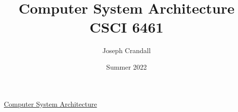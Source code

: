 
\usepackage{algorithm, algpseudocode, color, gensymb, siunitx, soul, subfiles, verbatim}
\usepackage[a4paper, total={7.5in, 10in}]{geometry}

\title{Computer System Architecture\\
\large CSCI 6461}
\author{Joseph Crandall}
\date{Summer 2022}


\maketitle

\href{https://www.mslcourses.com/CSCI6461Section10Summer2022/Schedule6461Section10Summer2022.html}{Computer System Architecture}

\begin{comment}

\section{Linear Algebra Review}


\end{comment}


